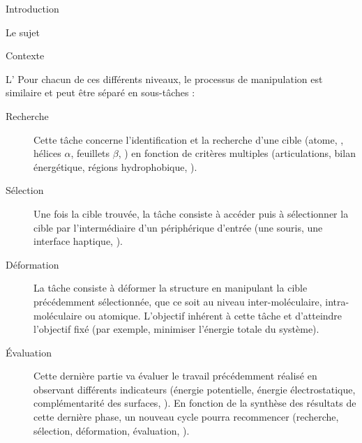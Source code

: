 \documentclass[myfrancais]{mythesis}
\begin{document}
\begin{mypart}{Introduction}
\begin{mychapter}{Le sujet}
\begin{mysection}{Contexte}
\begin{mysubsection}{L'}
					Pour chacun de ces différents niveaux, le processus de manipulation est similaire et peut être séparé en sous-tâches :
					\begin{description}
						\item[Recherche] Cette tâche concerne l'identification et la recherche d'une cible (atome, , hélices $\alpha$, feuillets $\beta$, \myetc) en fonction de critères multiples (articulations, bilan énergétique, régions hydrophobique, \myetc).
						\item[Sélection] Une fois la cible trouvée, la tâche consiste à accéder puis à sélectionner la cible par l'intermédiaire d'un périphérique d'entrée (une souris, une interface haptique, \myetc).
						\item[Déformation] La tâche consiste à déformer la structure en manipulant la cible précédemment sélectionnée, que ce soit au niveau inter-moléculaire, intra-moléculaire ou atomique.
							L'objectif inhérent à cette tâche et d'atteindre l'objectif fixé (par exemple, minimiser l'énergie totale du système).
						\item[Évaluation] Cette dernière partie va évaluer le travail précédemment réalisé en observant différents indicateurs (énergie potentielle, énergie électrostatique, complémentarité des surfaces, \myetc).
							En fonction de la synthèse des résultats de cette dernière phase, un nouveau cycle pourra recommencer (recherche, sélection, déformation, évaluation, \myetc).
					\end{description}


\end{mysubsection}
\end{mysection}
\end{mychapter}
\end{mypart}
\end{document}
